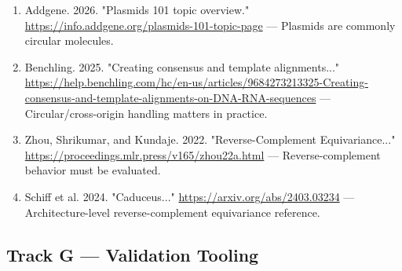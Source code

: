 \documentclass[11pt]{report}
\begin{document}
\begin{enumerate}
\item Addgene. 2026. "Plasmids 101 topic overview." \url{https://info.addgene.org/plasmids-101-topic-page} — Plasmids are commonly circular molecules.
\item Benchling. 2025. "Creating consensus and template alignments..." \url{https://help.benchling.com/hc/en-us/articles/9684273213325-Creating-consensus-and-template-alignments-on-DNA-RNA-sequences} — Circular/cross-origin handling matters in practice.
\item Zhou, Shrikumar, and Kundaje. 2022. "Reverse-Complement Equivariance..." \url{https://proceedings.mlr.press/v165/zhou22a.html} — Reverse-complement behavior must be evaluated.
\item Schiff et al. 2024. "Caduceus..." \url{https://arxiv.org/abs/2403.03234} — Architecture-level reverse-complement equivariance reference.
\end{enumerate}

\subsection{Track G — Validation Tooling}
\end{document}

